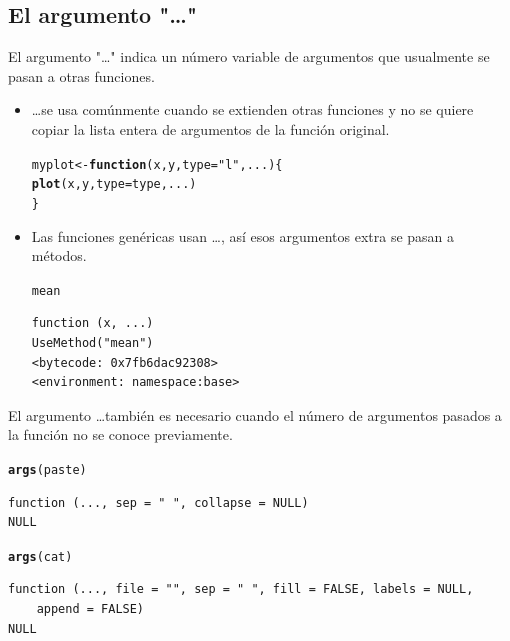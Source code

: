 \documentclass{article}\usepackage[]{graphicx}\usepackage[]{color}
\makeatletter
\newcommand{\hlstr}[1]{\textcolor[rgb]{0.192,0.494,0.8}{#1}}%
\newcommand{\hlstd}[1]{\textcolor[rgb]{0.345,0.345,0.345}{#1}}%
\newcommand{\hlkwa}[1]{\textcolor[rgb]{0.161,0.373,0.58}{\textbf{#1}}}%
\newcommand{\hlkwb}[1]{\textcolor[rgb]{0.69,0.353,0.396}{#1}}%
\newcommand{\hlkwc}[1]{\textcolor[rgb]{0.333,0.667,0.333}{#1}}%
\newcommand{\hlkwd}[1]{\textcolor[rgb]{0.737,0.353,0.396}{\textbf{#1}}}%
\newenvironment{kframe}{%
 \def\at@end@of@kframe{}%
 \ifinner\ifhmode%
  \def\at@end@of@kframe{\end{minipage}}%
  \begin{minipage}{\columnwidth}%
 \fi\fi%
 \def\FrameCommand##1{\hskip\@totalleftmargin \hskip-\fboxsep
 \colorbox{shadecolor}{##1}\hskip-\fboxsep
     \hskip-\linewidth \hskip-\@totalleftmargin \hskip\columnwidth}%
 \MakeFramed {\advance\hsize-\width
   \@totalleftmargin\z@ \linewidth\hsize
   \@setminipage}}%
 {\par\unskip\endMakeFramed%
 \at@end@of@kframe}
\newenvironment{knitrout}{}{} %
\makeatother
\begin{document}
  \subsection{El argumento "\dots"}
  El argumento "\dots" indica un número variable de argumentos que usualmente se pasan a otras funciones.
  \begin{itemize}
    \item \dots se usa comúnmente cuando se extienden otras funciones y no se quiere copiar la lista entera de argumentos de la función original.
\begin{knitrout}
\color{fgcolor}\begin{kframe}
\begin{alltt}
  \hlstd{myplot} \hlkwb{<-} \hlkwa{function}\hlstd{(}\hlkwc{x}\hlstd{,} \hlkwc{y}\hlstd{,} \hlkwc{type} \hlstd{=} \hlstr{"l"}\hlstd{,} \hlkwc{...}\hlstd{)\{}
    \hlkwd{plot}\hlstd{(x, y,} \hlkwc{type} \hlstd{= type, ...)}
  \hlstd{\}}
\end{alltt}
\end{kframe}
\end{knitrout}
    \item Las funciones genéricas usan \dots, así esos argumentos extra se pasan a métodos.
\begin{knitrout}
\color{fgcolor}\begin{kframe}
\begin{alltt}
  \hlstd{mean}
\end{alltt}
\begin{verbatim}
function (x, ...) 
UseMethod("mean")
<bytecode: 0x7fb6dac92308>
<environment: namespace:base>
\end{verbatim}
\end{kframe}
\end{knitrout}
  \end{itemize}

  El argumento \dots también es necesario cuando el número de argumentos pasados a la función no se conoce previamente.
\begin{knitrout}
\color{fgcolor}\begin{kframe}
\begin{alltt}
  \hlkwd{args}\hlstd{(paste)}
\end{alltt}
\begin{verbatim}
function (..., sep = " ", collapse = NULL) 
NULL
\end{verbatim}
\begin{alltt}
  \hlkwd{args}\hlstd{(cat)}
\end{alltt}
\begin{verbatim}
function (..., file = "", sep = " ", fill = FALSE, labels = NULL, 
    append = FALSE) 
NULL
\end{verbatim}
\end{kframe}
\end{knitrout}
  
\end{document}
